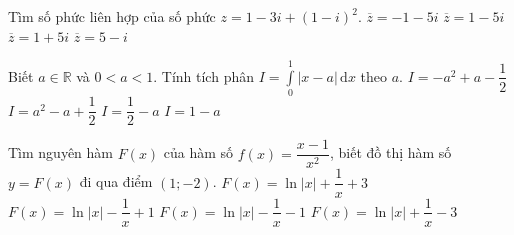 \begin{ex}%
	Tìm số phức liên hợp của số phức $z=1-3i+(1-i)^2$.
	\choice
	{$\overline{z}=-1-5i$}
	{$\overline{z}=1-5i$}
	{\True $\overline{z}=1+5i$}
	{$\overline{z}=5-i$}
\end{ex}

\begin{ex}%
	Biết $a\in \mathbb{R}$ và $0<a<1$. Tính tích phân $I=\displaystyle\int\limits_0^1 \left|x-a\right| \mathrm{\,d}x$ theo $a$.
	\choice
	{$I=-a^2+a-\dfrac{1}{2}$}
	{\True $I=a^2-a+\dfrac{1}{2}$}
	{$I=\dfrac{1}{2}-a$}
	{$I=1-a$}
\end{ex}

\begin{ex}%
	Tìm nguyên hàm $F(x)$ của hàm số $f(x)=\dfrac{x-1}{x^2}$, biết đồ thị hàm số $y=F(x)$ đi qua điểm $(1;-2)$.
	\choice
	{$F(x)=\ln \left|x\right|+\dfrac{1}{x}+3$}
	{$F(x)=\ln \left|x\right|-\dfrac{1}{x}+1$}
	{$F(x)=\ln \left|x\right|-\dfrac{1}{x}-1$}
	{\True $F(x)=\ln \left|x\right|+\dfrac{1}{x}-3$}
\end{ex}

